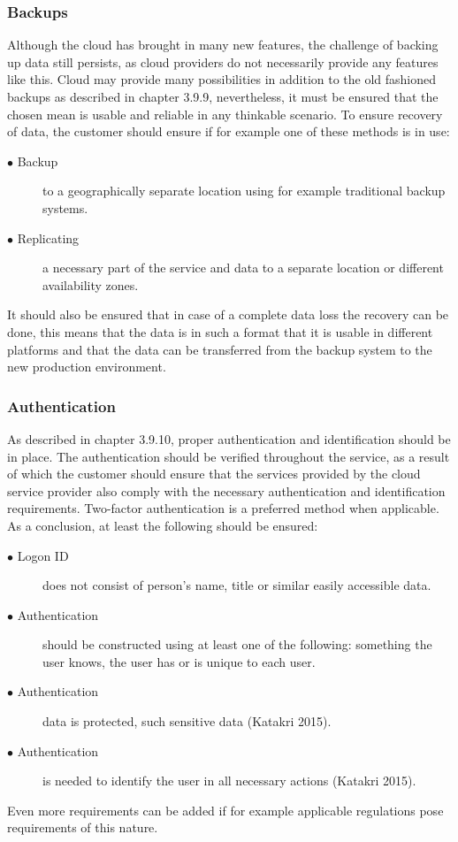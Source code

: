 \documentclass{article}
\begin{document}
\subsubsection{Backups}
Although the cloud has brought in many new features, the challenge of backing up data still persists, as cloud providers do not necessarily provide any features like this. Cloud may provide many possibilities in addition to the old fashioned backups as described in chapter 3.9.9, nevertheless, it must be ensured that the chosen mean is usable and reliable in any thinkable scenario. To ensure recovery of data, the customer should ensure if for example one of these methods is in use:
\begin{description}
	\item[$\bullet$ Backup] to a geographically separate location using for example traditional backup systems.
	\item[$\bullet$ Replicating] a necessary part of the service and data to a separate location or different availability zones.
\end{description}
It should also be ensured that in case of a complete data loss the recovery can be done, this means that the data is in such a format that it is usable in different platforms and that the data can be transferred from the backup system to the new production environment.

\subsubsection{Authentication}
As described in chapter 3.9.10, proper authentication and identification should be in place. The authentication should be verified throughout the service, as a result of which the customer should ensure that the services provided by the cloud service provider also comply with the necessary authentication and identification requirements. Two-factor authentication is a preferred method when applicable. As a conclusion, at least the following should be ensured:
\begin{description}
	\item[$\bullet$ Logon ID] does not consist of person's name, title or similar easily accessible data.
	\item[$\bullet$ Authentication] should be constructed using at least one of the following: something the user knows, the user has or is unique to each user.
	\item[$\bullet$ Authentication] data is protected, such sensitive data (Katakri 2015).
	\item[$\bullet$ Authentication] is needed to identify the user in all necessary actions (Katakri 2015).
\end{description}
Even more requirements can be added if for example applicable regulations pose requirements of this nature.
\end{document}
